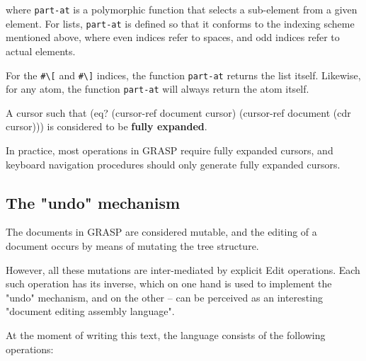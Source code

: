 \documentclass[sigconf]{acmart}
\newenvironment{Snippet}{\Verbatim[samepage=true]}{\endVerbatim}
\begin{document}
where \texttt{part-at} is a polymorphic function that selects
a sub-element from a given element. For lists,
\texttt{part-at} is defined so that it conforms to the indexing
scheme mentioned above, where even indices refer
to spaces, and odd indices refer to actual elements.

For the \texttt{\#\textbackslash[} and \texttt{\#\textbackslash]} indices, the 
function \texttt{part-at} returns the list itself. 
Likewise, for any atom, the function \texttt{part-at} will
always return the atom itself.

A cursor such that 
\begin{Snippet}
(eq? (cursor-ref document cursor)
     (cursor-ref document (cdr cursor)))
\end{Snippet}
is considered to be \textbf{fully expanded}.

In practice, most operations in GRASP require
fully expanded cursors, and keyboard navigation
procedures should only generate fully expanded
cursors.

\subsection{The "undo" mechanism}

The documents in GRASP are considered mutable,
and the editing of a document occurs by means
of mutating the tree structure.

However, all these mutations are inter-mediated
by explicit Edit operations. Each such operation
has its inverse, which on one hand is used to
implement the "undo" mechanism, and on 
the other -- can be perceived as an interesting 
"document editing assembly language".

At the moment of writing this text, the language
consists of the following operations:
\end{document}
